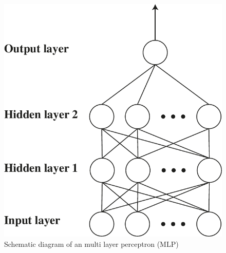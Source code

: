 \documentclass[11pt,a4paper]{article}
\begin{document}
\begin{figure}[h]
	\centering
	\includegraphics[scale=0.6]{MLP.pdf}
	\caption{Schematic diagram of an multi layer perceptron (MLP)}
	\label{figure:MLP}
\end{figure}
\ \\
\end{document}
